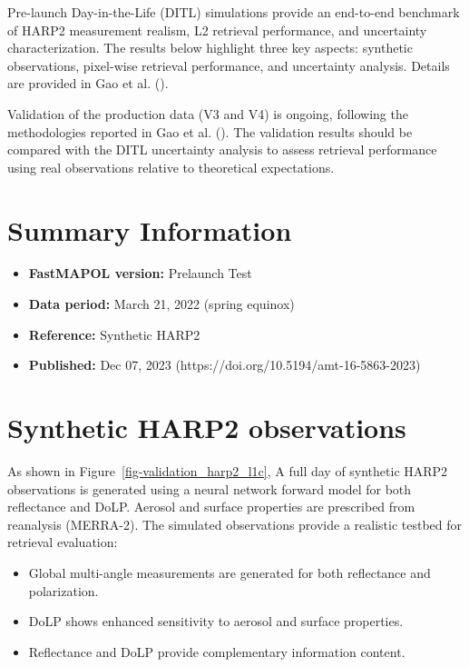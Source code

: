 \documentclass[
  11pt,
  letterpaper,
]{scrreprt}
\providecommand{\tightlist}{%
  \setlength{\itemsep}{0pt}\setlength{\parskip}{0pt}}
\begin{document}
Pre-launch Day-in-the-Life (DITL) simulations provide an end-to-end
benchmark of HARP2 measurement realism, L2 retrieval performance, and
uncertainty characterization. The results below highlight three key
aspects: synthetic observations, pixel-wise retrieval performance, and
uncertainty analysis. Details are provided in Gao et al.
().

Validation of the production data (V3 and V4) is ongoing, following the
methodologies reported in Gao et al. ().
The validation results should be compared with the DITL uncertainty
analysis to assess retrieval performance using real observations
relative to theoretical expectations.

\section{Summary Information}\label{summary-information-1}

\begin{itemize}
\tightlist
\item
  \textbf{FastMAPOL version:} Prelaunch Test\\
\item
  \textbf{Data period:} March 21, 2022 (spring equinox)\\
\item
  \textbf{Reference:} Synthetic HARP2\\
\item
  \textbf{Published:} Dec 07, 2023
  (https://doi.org/10.5194/amt-16-5863-2023)
\end{itemize}

\section{Synthetic HARP2
observations}\label{synthetic-harp2-observations}

As shown in Figure~\ref{fig-validation_harp2_l1c}, A full day of
synthetic HARP2 observations is generated using a neural network forward
model for both reflectance and DoLP. Aerosol and surface properties are
prescribed from reanalysis (MERRA-2). The simulated observations provide
a realistic testbed for retrieval evaluation:

\begin{itemize}
\tightlist
\item
  Global multi-angle measurements are generated for both reflectance and
  polarization.\\
\item
  DoLP shows enhanced sensitivity to aerosol and surface properties.\\
\item
  Reflectance and DoLP provide complementary information content.
\end{itemize}
\end{document}
